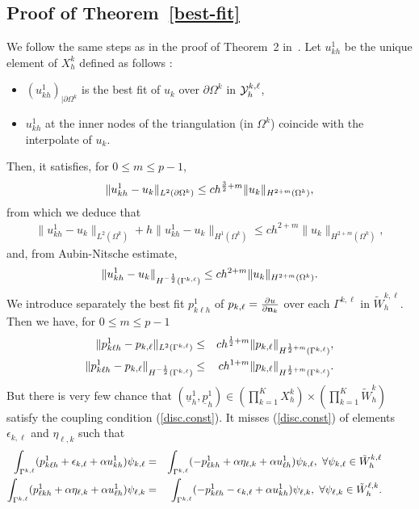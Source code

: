 \documentclass[final]{siamltex}
\begin{document}
\subsection{Proof of Theorem~\ref{best-fit}}
We follow the same steps as in the proof of Theorem~2 in~\cite{JMN10}.
Let $u_{kh}^1$ be the unique element of $X_h^k$ defined as follows :
\begin{itemize}
\item
$(u_{kh}^1)_{|\partial \Omega^k}$ is the best fit of $u_k$ over
  $\partial \Omega^k$ in ${\cal Y}_h^{k,\ell}$,
\item
$u_{kh}^1$ at the inner nodes of the triangulation (in $\Omega^k$)
  coincide with the interpolate of $u_k$.
\end{itemize}
Then, it satisfies, for $0\le m\le p-1$,
\begin{eqnarray}\label{bestfit_u.2}
\| u_{kh}^1 - u_k\|_{L^2(\partial \Omega^k)}
\le c h^{{3 \over 2}+m} \|u_k\|_{H^{2+m}(\Omega^k)},
\end{eqnarray}
from which we deduce that
\begin{eqnarray}
\label{bestfit_u}
\| u_{kh}^1 - u_k\|_{L^2(\Omega^k)} + h\| u_{kh}^1 - u_k\|_{H^1(\Omega^k)}
\le c h^{2+m} \|u_k\|_{H^{2+m}(\Omega^k)},
\end{eqnarray}
and, from Aubin-Nitsche estimate, 
\begin{eqnarray}
\label{bestfit_u.3}
\| u_{kh}^1 - u_k\|_{H^{-{1 \over 2}}(\Gamma^{k,\ell})}
\le c h^{2+m} \|u_k\|_{H^{2+m}(\Omega^k)}.
\end{eqnarray}
We introduce  separately the best fit $p_{k \ell h}^1$ of
$p_{k,\ell}=\frac{\partial u}{\partial {\bf n}_k}$
over each
$\Gamma^{k,\ell}$ in $\tilde W_h^{k,\ell}$. Then we have, for $0\le m\le p-1$ 
\begin{eqnarray}
\label{bestfit_p}
\| p_{k \ell h}^1 - p_{k,\ell} \|_{L^2(\Gamma^{k,\ell})}
&\le& c h^{{1 \over 2}+m} \| p_{k,\ell} \|_{H^{{1 \over 2}+m}(\Gamma^{k,\ell})},
\\
\label{bestfit_p.2}
\| p_{k \ell h}^1 - p_{k,\ell} \|_{H^{-{1 \over 2}}(\Gamma^{k,\ell})}
&\le& c h^{1+m} \| p_{k,\ell} \|_{H^{{1 \over 2}+m}(\Gamma^{k,\ell})}.
\end{eqnarray}
But there is very few chance that $({{\underline u}}_h^1,{{\underline p}}_h^1) \in
\left(\prod_{k=1}^K X_h^k\right)\times \left(\prod_{k=1}^K \tilde
W_h^{k}\right)$ satisfy the
coupling condition (\ref{disc.const}). It misses (\ref{disc.const}) of elements
$\epsilon_{k,\ell}$ and $\eta_{\ell,k}$ such that
\begin{eqnarray}
\label{inteps_eta1}
\int_{\Gamma^{k,\ell}}(p_{k\ell h}^1+\epsilon_{k,\ell}+\alpha u_{kh}^1)
\psi_{k,\ell}
&=& \int_{\Gamma^{k,\ell}}(-p_{\ell kh}^1+\alpha \eta_{\ell,k} +\alpha u_{\ell
h}^1) \psi_{k,\ell}
,\ \forall \psi_{k,\ell} \in \tilde W_h^{k,\ell}
\hspace{10mm}\\
\label{inteps_eta2}
\int_{\Gamma^{k,\ell}}(p_{\ell kh}^1+\alpha \eta_{\ell,k} +\alpha u_{\ell
h}^1) \psi_{\ell,k} &=&
\int_{\Gamma^{k,\ell}}(-p_{k\ell h}^1-\epsilon_{k,\ell}+\alpha u_{kh}^1)
\psi_{\ell,k}
,\ \forall \psi_{\ell,k} \in \tilde W_h^{\ell,k}.\hspace{10mm}
\end{eqnarray}
\end{document}
